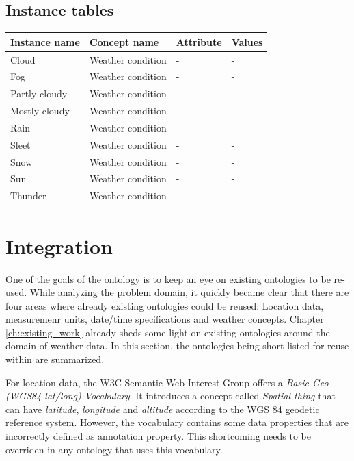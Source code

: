 
\subsection{Instance tables}

\begin{longtable}{|p{}|p{}|p{}|p{}|}
  \hline
  \textbf{Instance name} & \textbf{Concept name} & \textbf{Attribute} & \textbf{Values} \\
  \hline\hline
  Cloud & Weather condition & - & - \\
  \hline
  Fog & Weather condition & - & - \\
  \hline
  Partly cloudy & Weather condition & - & - \\
  \hline
  Mostly cloudy & Weather condition & - & - \\
  \hline
  Rain & Weather condition & - & - \\
  \hline
  Sleet & Weather condition & - & - \\
  \hline
  Snow & Weather condition & - & - \\
  \hline
  Sun & Weather condition & - & - \\
  \hline
  Thunder & Weather condition & - & - \\
  \hline
\end{longtable}

\section{Integration}
\label{sec:integration}

One of the goals of the \thinkhomeweather ontology is to keep an eye on existing ontologies to be re-used. While analyzing the problem domain, it quickly became clear that there are four areas where already existing ontologies could be reused: Location data, measuremenr units, date/time specifications and weather concepts. Chapter \ref{ch:existing_work} already sheds some light on existing ontologies around the domain of weather data. In this section, the ontologies being short-listed for reuse within \thinkhomeweather are summarized.

For location data, the W3C Semantic Web Interest Group offers a \emph{Basic Geo (WGS84 lat/long) Vocabulary}. It introduces a concept called \emph{Spatial thing} that can have \emph{latitude}, \emph{longitude} and \emph{altitude} according to the WGS 84 geodetic reference system. However, the vocabulary contains some data properties that are incorrectly defined as annotation property. This shortcoming needs to be overriden in any ontology that uses this vocabulary.

